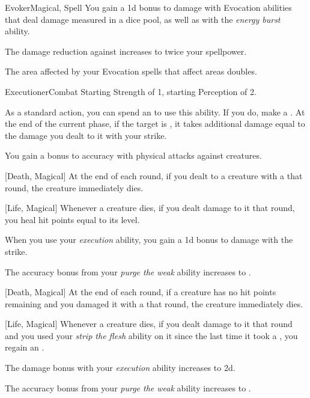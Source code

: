 \begin{feat}{Evoker}{Magical, Spell}
         You gain a \plus1d bonus to damage with Evocation abilities that deal damage measured in a dice pool, as well as with the \textit{energy burst} ability.

         The damage reduction against  increases to twice your spellpower.

         The area affected by your Evocation spells that affect areas doubles.
    \end{feat}

    \begin{feat}{Executioner}{Combat}
        \featpres Starting Strength of 1, starting Perception of 2.
        \featben

         As a standard action, you can spend an  to use this ability.
        If you do, make a .
        At the end of the current phase, if the target is , it takes additional damage equal to the damage you dealt to it with your strike.

         You gain a  bonus to accuracy with physical attacks against  creatures.

        [Death, Magical] At the end of each round, if you dealt  to a creature with a  that round, the creature immediately dies.

        [Life, Magical] Whenever a creature dies, if you dealt damage to it that round, you heal hit points equal to its level.

         When you use your \textit{execution} ability, you gain a \plus1d bonus to damage with the strike.

         The accuracy bonus from your \textit{purge the weak} ability increases to .

        [Death, Magical] At the end of each round, if a creature has no hit points remaining and you damaged it with a  that round, the creature immediately dies.

        [Life, Magical] Whenever a creature dies, if you dealt damage to it that round and you used your \textit{strip the flesh} ability on it since the last time it took a , you regain an .

         The damage bonus with your \textit{execution} ability increases to \plus2d.

         The accuracy bonus from your \textit{purge the weak} ability increases to .
    \end{feat}

